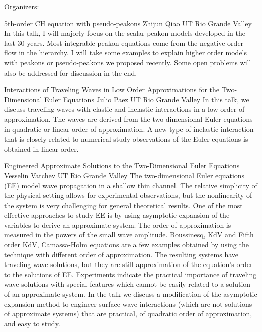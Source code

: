 \label{mini24}

\miniabs
{}
{Organizers: }
{}

\vspace{2ex}
\abs
{5th-order CH equation with pseudo-peakons}
{Zhijun Qiao }
{UT Rio Grande Valley}
{In this talk, I will majorly focus on the scalar peakon models developed in the last 30 years. Most integrable peakon equations come from the negative order flow in the hierarchy. I will take some examples to explain higher order models with peakons or pseudo-peakons we proposed recently. Some open problems will also be addressed for discussion in the end.}


\vspace{1.5ex}
\abs
{Interactions of Traveling Waves in Low Order Approximations
for the Two-Dimensional Euler Equations}
{Julio Paez}
{UT Rio Grande Valley}
{In this talk, we discuss traveling waves with elastic and inelastic interactions in a low order of approximation. The waves are derived from the two-dimensional Euler equations in quadratic or linear order of approximation.  A new type of inelastic interaction that is closely related to numerical study observations of the Euler equations is obtained in linear order.}


\vspace{1.5ex}
\abs
{Engineered Approximate Solutions to the Two-Dimensional Euler Equations}
{Vesselin Vatchev}
{UT Rio Grande Valley}
{The two-dimensional Euler equations (EE) model wave propagation in a shallow thin channel. The relative simplicity of the physical setting allows for experimental observations, but the nonlinearity of the system is very challenging for general theoretical results. One of the most effective approaches to study EE is by using asymptotic expansion of the variables to derive an approximate system. The order of approximation is measured in the powers of the small wave amplitude. Boussinesq, KdV and Fifth order KdV, Camassa-Holm equations are a few examples obtained by using the technique with different order of approximation. The resulting systems have traveling wave solutions, but they are still approximation of the equation’s order to the solutions of EE. Experiments indicate the practical importance of traveling wave solutions with special features which cannot be easily related to a solution of an approximate system. In the talk we discuss a modification of the asymptotic expansion method to engineer surface wave interactions (which are not solutions of approximate systems)  that are practical, of quadratic order of approximation, and easy to study.}


